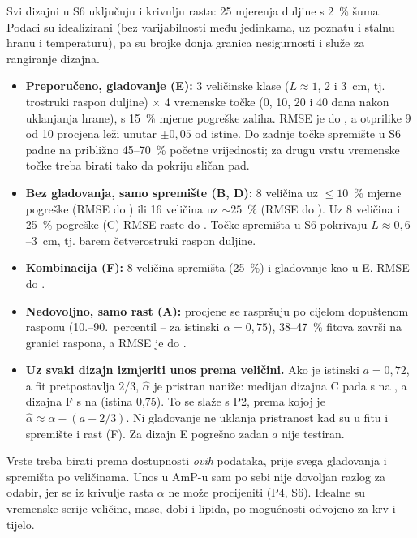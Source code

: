 \begin{kljucno}
Svi dizajni u S6 uključuju i krivulju rasta: 25 mjerenja duljine s 2~\% šuma. Podaci su idealizirani (bez varijabilnosti među jedinkama, uz poznatu i stalnu hranu i temperaturu), pa su brojke donja granica nesigurnosti i služe za rangiranje dizajna.
\begin{itemize}[leftmargin=1.4em]
\item \textbf{Preporučeno, gladovanje (E):} 3 veličinske klase ($L\approx1$, 2 i 3~cm, tj. trostruki raspon duljine) × 4 vremenske točke (0, 10, 20 i 40 dana nakon uklanjanja hrane), s 15~\% mjerne pogreške zaliha. RMSE je do \MCErmse, a otprilike 9 od 10 procjena leži unutar $\pm0{,}05$ od istine. Do zadnje točke spremište u S6 padne na približno 45–70~\% početne vrijednosti; za drugu vrstu vremenske točke treba birati tako da pokriju sličan pad.
\item \textbf{Bez gladovanja, samo spremište (B, D):} 8 veličina uz $\le10$~\% mjerne pogreške (RMSE do \MCBrmse) ili 16 veličina uz $\sim25$~\% (RMSE do \MCDrmse). Uz 8 veličina i 25~\% pogreške (C) RMSE raste do \MCCrmse. Točke spremišta u S6 pokrivaju $L\approx0{,}6$–3~cm, tj. barem četverostruki raspon duljine.
\item \textbf{Kombinacija (F):} 8 veličina spremišta (25~\%) i gladovanje kao u E. RMSE do \MCFrmse.
\item \textbf{Nedovoljno, samo rast (A):} procjene se raspršuju po cijelom dopuštenom rasponu (10.–90.~percentil \MCAsevenfiveLo–\MCAsevenfiveHi{} za istinski $\alpha=0{,}75$), 38–47~\% fitova završi na granici raspona, a RMSE je do \MCArmse.
\item \textbf{Uz svaki dizajn izmjeriti unos prema veličini.} Ako je istinski $a=0{,}72$, a fit pretpostavlja $2/3$, $\hat\alpha$ je pristran naniže: medijan dizajna C pada s \MCCokMed{} na \MCCmisMed, a dizajna F s \MCFokMed{} na \MCFmisMed{} (istina 0,75). To se slaže s P2, prema kojoj je $\hat\alpha\approx\alpha-(a-2/3)$. Ni gladovanje ne uklanja pristranost kad su u fitu i spremište i rast (F). Za dizajn E pogrešno zadan $a$ nije testiran.
\end{itemize}
\end{kljucno}

Vrste treba birati prema dostupnosti \emph{ovih} podataka, prije svega gladovanja i spremišta po veličinama. Unos u AmP-u sam po sebi nije dovoljan razlog za odabir, jer se iz krivulje rasta $\alpha$ ne može procijeniti (P4, S6). Idealne su vremenske serije veličine, mase, dobi i lipida, po mogućnosti odvojeno za krv i tijelo.

